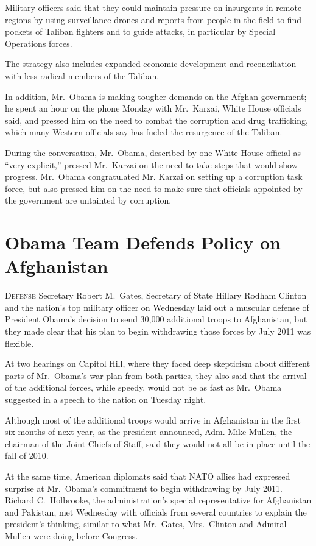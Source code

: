 ﻿\documentclass[12pt]{article}
\begin{document}
Military officers said that they could maintain pressure on insurgents in remote regions by using
surveillance drones and reports from people in the field to find pockets of Taliban fighters and to
guide attacks, in particular by Special Operations forces.

The strategy also includes expanded economic development and reconciliation with less radical
members of the Taliban.

In addition, Mr.~Obama is making tougher demands on the Afghan government; he spent an hour on the
phone Monday with Mr.~Karzai, White House officials said, and pressed him on the need to combat the
corruption and drug trafficking, which many Western officials say has fueled the resurgence of the
Taliban.

During the conversation, Mr.~Obama, described by one White House official as ``very explicit,''
pressed Mr.~Karzai on the need to take steps that would show progress. Mr.~Obama congratulated Mr.
Karzai on setting up a corruption task force, but also pressed him on the need to make sure that
officials appointed by the government are untainted by corruption.

\section{Obama Team Defends Policy on Afghanistan}

\lettrine{D}{efense} Secretary Robert M.~Gates, Secretary of State Hillary
Rodham Clinton and the nation's top military officer on Wednesday laid out a muscular defense of
President Obama's decision to send 30,000 additional troops to Afghanistan, but they made clear that
his plan to begin withdrawing those forces by July 2011 was flexible.

At two hearings on Capitol Hill, where they faced deep skepticism about different parts of
Mr.~Obama's war plan from both parties, they also said that the arrival of the additional forces,
while speedy, would not be as fast as Mr.~Obama suggested in a speech to the nation on Tuesday
night.

Although most of the additional troops would arrive in Afghanistan in the first six months of next
year, as the president announced, Adm. Mike Mullen, the chairman of the Joint Chiefs of Staff, said
they would not all be in place until the fall of 2010.

At the same time, American diplomats said that NATO allies had expressed surprise at Mr.~Obama's
commitment to begin withdrawing by July 2011. Richard C.~Holbrooke, the administration's special
representative for Afghanistan and Pakistan, met Wednesday with officials from several countries to
explain the president's thinking, similar to what Mr.~Gates, Mrs.~Clinton and Admiral Mullen were
doing before Congress.
\end{document}
